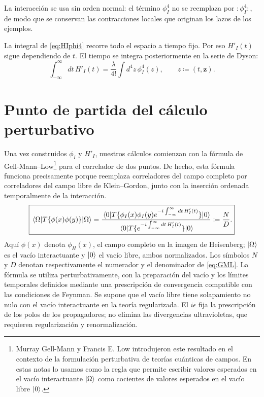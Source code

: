 \documentclass[11pt,letterpaper]{article}
\theoremstyle{definition}
\theoremstyle{definition}
\newcommand{\eqbox}[1]{\boxed{\displaystyle #1}}
\begin{document}
La interacción se usa sin orden normal: el término $\phi_I^4$ no se
reemplaza por $:\!\phi_I^4\!:$, de modo que se conservan las contracciones
locales que originan los lazos de los ejemplos.

La integral de \eqref{eq:HIphi4} recorre todo el espacio a tiempo fijo. Por eso
$H'_I(t)$ sigue dependiendo de $t$. El tiempo se integra posteriormente en la serie de
Dyson:
\begin{equation}
  \eqbox{\int_{-\infty}^{\infty}dt\,H'_I(t)
  =\frac{\lambda}{4!}\int d^4z\,\phi_I^4(z),
  \qquad z\coloneqq(t,\mathbf{z}).}
  \label{eq:intHI}
\end{equation}

\section{Punto de partida del cálculo perturbativo}

Una vez construidos $\phi_I$ y $H'_I$, nuestros cálculos comienzan con la
fórmula de Gell-Mann--Low\footnote{Murray Gell-Mann y Francis E. Low
introdujeron este resultado en el contexto de la formulación perturbativa de
teorías cuánticas de campos. En estas notas lo usamos como la regla que permite
escribir valores esperados en el vacío interactuante $\ket{\Omega}$ como
cocientes de valores esperados en el vacío libre $\ket{0}$.} para el correlador
de dos puntos.
De hecho, esta fórmula funciona precisamente porque reemplaza correladores del
campo completo por correladores del campo libre de Klein--Gordon, junto con la
inserción ordenada temporalmente de la interacción.
\begin{equation}
  \boxed{\displaystyle
  \mel{\Omega}{T\{\phi(x)\phi(y)\}}{\Omega}
  =
  \frac{
    \mel{0}{T\{\phi_I(x)\phi_I(y)
    e^{-i\int_{-\infty}^{\infty}dt\,H'_I(t)}\}}{0}
  }{
    \mel{0}{T\{e^{-i\int_{-\infty}^{\infty}dt\,H'_I(t)}\}}{0}
  }
  \coloneqq\frac{N}{D}.}
  \label{eq:GML}
\end{equation}
Aquí $\phi(x)$ denota $\phi_H(x)$, el campo completo en la imagen de
Heisenberg; $\ket{\Omega}$ es el vacío interactuante y $\ket{0}$ el vacío
libre, ambos normalizados. Los símbolos $N$ y $D$ denotan respectivamente
el numerador y el denominador de \eqref{eq:GML}.
La fórmula se utiliza perturbativamente, con la preparación del vacío y
los límites temporales definidos mediante una prescripción de convergencia
compatible con las condiciones de Feynman. Se supone que el vacío libre
tiene solapamiento no nulo con el vacío interactuante en la teoría
regularizada. El $i\epsilon$ fija la prescripción de los polos de los
propagadores; no elimina las divergencias ultravioletas, que requieren
regularización y renormalización.
\end{document}
